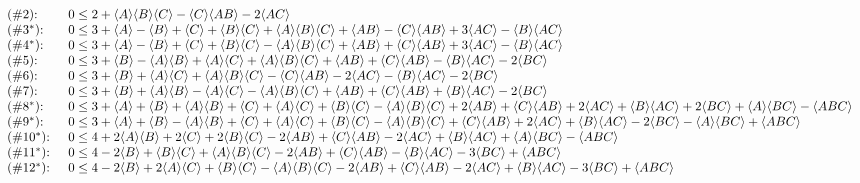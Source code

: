{\begin{align*}
{\begin{array}{ll}
 \text{($\#$} 2 \text{):  } & 0\leq 2+\langle A\rangle \langle B\rangle \langle C\rangle-\langle C\rangle \langle AB\rangle-2 \langle AC\rangle \\
 \text{($\#$} 3^* \text{):  } & 0\leq 3+\langle A\rangle-\langle B\rangle+\langle C\rangle+\langle B\rangle \langle C\rangle+\langle A\rangle \langle B\rangle
   \langle C\rangle+\langle AB\rangle-\langle C\rangle \langle AB\rangle+3 \langle AC\rangle-\langle B\rangle \langle AC\rangle \\
 \text{($\#$} 4^* \text{):  } & 0\leq 3+\langle A\rangle-\langle B\rangle+\langle C\rangle+\langle B\rangle \langle C\rangle-\langle A\rangle \langle B\rangle
   \langle C\rangle+\langle AB\rangle+\langle C\rangle \langle AB\rangle+3 \langle AC\rangle-\langle B\rangle \langle AC\rangle \\
 \text{($\#$} 5 \text{):  } & 0\leq 3+\langle B\rangle-\langle A\rangle \langle B\rangle+\langle A\rangle \langle C\rangle+\langle A\rangle \langle B\rangle
   \langle C\rangle+\langle AB\rangle+\langle C\rangle \langle AB\rangle-\langle B\rangle \langle AC\rangle-2 \langle BC\rangle \\
 \text{($\#$} 6 \text{):  } & 0\leq 3+\langle B\rangle+\langle A\rangle \langle C\rangle+\langle A\rangle \langle B\rangle \langle C\rangle-\langle C\rangle \langle AB\rangle-2
   \langle AC\rangle-\langle B\rangle \langle AC\rangle-2 \langle BC\rangle \\
 \text{($\#$} 7 \text{):  } & 0\leq 3+\langle B\rangle+\langle A\rangle \langle B\rangle-\langle A\rangle \langle C\rangle-\langle A\rangle \langle B\rangle
   \langle C\rangle+\langle AB\rangle+\langle C\rangle \langle AB\rangle+\langle B\rangle \langle AC\rangle-2 \langle BC\rangle \\
 \text{($\#$} 8^* \text{):  } & 0\leq 3+\langle A\rangle+\langle B\rangle+\langle A\rangle \langle B\rangle+\langle C\rangle+\langle A\rangle \langle C\rangle+\langle B\rangle
   \langle C\rangle-\langle A\rangle \langle B\rangle \langle C\rangle+2 \langle AB\rangle+\langle C\rangle \langle AB\rangle+2 \langle AC\rangle+\langle B\rangle \langle AC\rangle+2 \langle BC\rangle+\langle A\rangle
   \langle BC\rangle-\langle ABC\rangle \\
 \text{($\#$} 9^* \text{):  } & 0\leq 3+\langle A\rangle+\langle B\rangle-\langle A\rangle \langle B\rangle+\langle C\rangle+\langle A\rangle \langle C\rangle+\langle B\rangle
   \langle C\rangle-\langle A\rangle \langle B\rangle \langle C\rangle+\langle C\rangle \langle AB\rangle+2 \langle AC\rangle+\langle B\rangle \langle AC\rangle-2 \langle BC\rangle-\langle A\rangle
   \langle BC\rangle+\langle ABC\rangle \\
 \text{($\#$} 10^* \text{):  } & 0\leq 4+2 \langle A\rangle \langle B\rangle+2 \langle C\rangle+2 \langle B\rangle \langle C\rangle-2 \langle AB\rangle+\langle C\rangle \langle AB\rangle-2
   \langle AC\rangle+\langle B\rangle \langle AC\rangle+\langle A\rangle \langle BC\rangle-\langle ABC\rangle \\
 \text{($\#$} 11^* \text{):  } & 0\leq 4-2 \langle B\rangle+\langle B\rangle \langle C\rangle+\langle A\rangle \langle B\rangle \langle C\rangle-2 \langle AB\rangle+\langle C\rangle
   \langle AB\rangle-\langle B\rangle \langle AC\rangle-3 \langle BC\rangle+\langle ABC\rangle \\
 \text{($\#$} 12^* \text{):  } & 0\leq 4-2 \langle B\rangle+2 \langle A\rangle \langle C\rangle+\langle B\rangle \langle C\rangle-\langle A\rangle \langle B\rangle \langle C\rangle-2
   \langle AB\rangle+\langle C\rangle \langle AB\rangle-2 \langle AC\rangle+\langle B\rangle \langle AC\rangle-3 \langle BC\rangle+\langle ABC\rangle \\

\end{array}}
\end{align*}}
